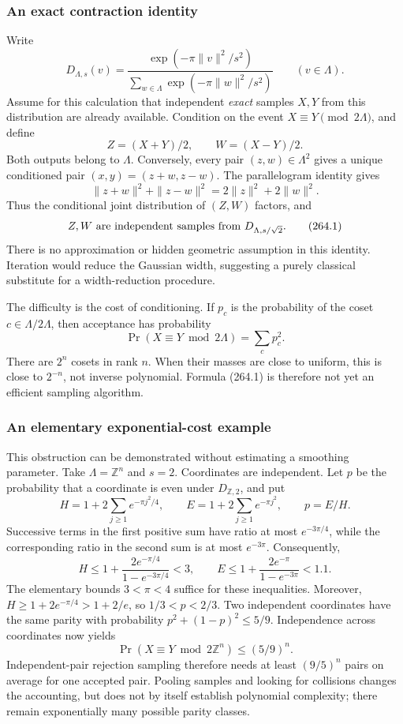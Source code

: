\documentclass[11pt]{article}
\begin{document}
\subsubsection{An exact contraction identity}
Write
\[
 D_{\Lambda,s}(v)=\frac{\exp(-\pi\|v\|^2/s^2)}
 {\sum_{w\in\Lambda}\exp(-\pi\|w\|^2/s^2)}
 \qquad(v\in\Lambda).
\]
Assume for this calculation that independent \emph{exact} samples $X,Y$ from this distribution are already available. Condition on the event
$X\equiv Y\pmod{2\Lambda}$, and define
\[
 Z=(X+Y)/2,\qquad W=(X-Y)/2.
\]
Both outputs belong to $\Lambda$. Conversely, every pair $(z,w)\in\Lambda^2$ gives a unique conditioned pair
$(x,y)=(z+w,z-w)$. The parallelogram identity gives
\[
 \|z+w\|^2+\|z-w\|^2=2\|z\|^2+2\|w\|^2.
\]
Thus the conditional joint distribution of $(Z,W)$ factors, and
\[
 Z,W\ \hbox{are independent samples from }D_{\Lambda,s/\sqrt2}.
 \tag{264.1}
\]
There is no approximation or hidden geometric assumption in this identity. Iteration would reduce the Gaussian width, suggesting a purely classical substitute for a width-reduction procedure.

The difficulty is the cost of conditioning. If $p_c$ is the probability of the coset $c\in\Lambda/2\Lambda$, then acceptance has probability
\[
 \Pr(X\equiv Y\bmod 2\Lambda)=\sum_c p_c^2.
 \tag{264.2}
\]
There are $2^n$ cosets in rank $n$. When their masses are close to uniform, this is close to $2^{-n}$, not inverse polynomial. Formula (264.1) is therefore not yet an efficient sampling algorithm.

\subsubsection{An elementary exponential-cost example}
This obstruction can be demonstrated without estimating a smoothing parameter. Take $\Lambda=\mathbb Z^n$ and $s=2$. Coordinates are independent. Let $p$ be the probability that a coordinate is even under $D_{\mathbb Z,2}$, and put
\[
 H=1+2\sum_{j\ge1}e^{-\pi j^2/4},\qquad
 E=1+2\sum_{j\ge1}e^{-\pi j^2},\qquad p=E/H.
\]
Successive terms in the first positive sum have ratio at most
$e^{-3\pi/4}$, while the corresponding ratio in the second sum is at most $e^{-3\pi}$. Consequently,
\[
 H\le1+\frac{2e^{-\pi/4}}{1-e^{-3\pi/4}}<3,\qquad
 E\le1+\frac{2e^{-\pi}}{1-e^{-3\pi}}<1.1.
\]
The elementary bounds $3<\pi<4$ suffice for these inequalities. Moreover,
$H\ge1+2e^{-\pi/4}>1+2/e$, so $1/3<p<2/3$. Two independent coordinates have the same parity with probability
$p^2+(1-p)^2\le5/9$. Independence across coordinates now yields
\[
 \Pr(X\equiv Y\bmod2\mathbb Z^n)\le(5/9)^n.
 \tag{264.3}
\]
Independent-pair rejection sampling therefore needs at least $(9/5)^n$ pairs on average for one accepted pair. Pooling samples and looking for collisions changes the accounting, but does not by itself establish polynomial complexity; there remain exponentially many possible parity classes.
\end{document}
